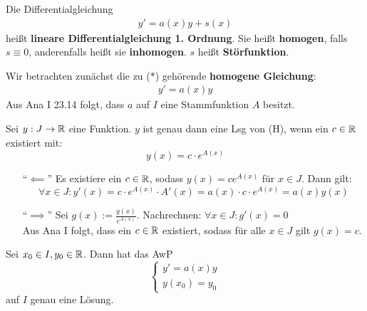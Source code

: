 \documentclass[a4paper,twoside,DIV15,BCOR12mm,chapterprefix=true,headings=twolinechapter]{scrbook}
\begin{document}
\begin{definition}
Die Differentialgleichung
\begin{align*}
& y'=a(x)y+s(x)&\tag{$*$}
\end{align*}
heißt \textbf{lineare Differentialgleichung 1. Ordnung}. Sie heißt \textbf{homogen},
falls $s\equiv 0$, anderenfalls heißt sie \textbf{inhomogen}. $s$ heißt \textbf{Störfunktion}.
\end{definition}

Wir betrachten zunächst die zu ($*$) gehörende \textbf{homogene Gleichung}:
\begin{align*}
&y'=a(x)y&\tag{H}
\end{align*}
Aus Ana I 23.14 folgt, dass $a$ auf $I$ eine Stammfunktion $A$ besitzt.

\begin{satz}
Sei $y:J\to\mathbb{R}$ eine Funktion. $y$ ist genau dann eine Lsg von (H), wenn ein $c\in\mathbb{R}$
existiert mit:
\[y(x)=c\cdot e^{A(x)}\]
\end{satz}

\begin{beweis}
\begin{enumerate}
\item["`$\impliedby$"'] Es existiere ein $c\in\mathbb{R}$, sodass $y(x)=ce^{A(x)}$ für $x\in J$. Dann gilt:
\[\forall x\in J: y'(x)=c\cdot e^{A(x)}\cdot A'(x)=a(x)\cdot c\cdot e^{A(x)}=a(x)y(x)\]
\item["`$\implies$"'] Sei $g(x):=\frac{y(x)}{e^{A(x)}}$. Nachrechnen: $\forall x\in J:g'(x)=0$\\
Aus Ana I folgt, dass ein $c\in\mathbb{R}$ existiert, sodass für alle $x\in J$ gilt $g(x)=c$.
\end{enumerate}
\end{beweis}

\begin{satz}
Sei $x_0\in I,y_0\in\mathbb{R}$. Dann hat das AwP
\[\begin{cases}
y'=a(x)y\\
y(x_0)=y_0
\end{cases}\]
auf $I$ genau eine Lösung.
\end{satz}
\end{document}
